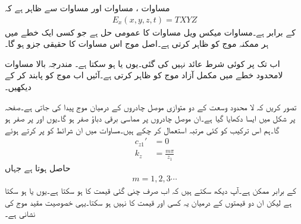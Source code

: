 مساوات ، مساوات  اور مساوات  سے ظاہر ہے کہ
\begin{align}\label{مساوات_مویج_گمکی_عمومی_ت}
E_x(x,y,z,t)=T X Y Z 
\end{align}
کے برابر ہے۔مساوات  میکس ویل مساوات کا عمومی حل ہے جو کسی ایک خطے میں ہر ممکنہ  موج کو ظاہر کرتی ہے۔اصل موج اس مساوات کا حقیقی  جزو ہو گا۔

اب تک  پر کوئی شرط عائد نہیں کی گئی۔یوں  یا  ہو سکتا ہے۔ مندرجہ بالا مساوات لامحدود خطے میں مکمل آزاد موج کو ظاہر کرتی ہے۔آئیں اب موج کو پابند کر کے دیکھیں۔ 

تصور کریں کہ لا محدود وسعت کے دو متوازی موصل چادروں کے درمیان موج پیدا کی جاتی ہے۔صفحہ  پر شکل  میں ایسا دکھایا گیا ہے۔ان موصل چادروں پر مماسی برقی دباؤ صفر ہو گا۔یوں  اور  پر  صفر ہو گا۔ہم 
اس ترکیب کو کئی مرتبہ استعمال کر چکے ہیں۔مساوات  میں ان شرائط کو پر کرتے ہوئے 
\begin{align}
c_{z1}'&=0\\
k_z &=\frac{m \pi}{z_1}\label{مساوات_مویج_میکس_ویل_عمومی_مستطیلی_شرط_الف}
\end{align}
حاصل ہوتا ہے جہاں
\begin{align}
m=1,2,3\cdots
\end{align}
کے برابر ممکن ہے۔آپ دیکھ سکتے ہیں کہ  اب صرف چنی گئی قیمت کا ہو سکتا ہے۔یوں  یا   ہو سکتا ہے لیکن ان دو قیمتوں کے درمیان یہ کسی اور قیمت کا نہیں ہو سکتا۔یہی خصوصیت مقید موج کی نشانی ہے۔

